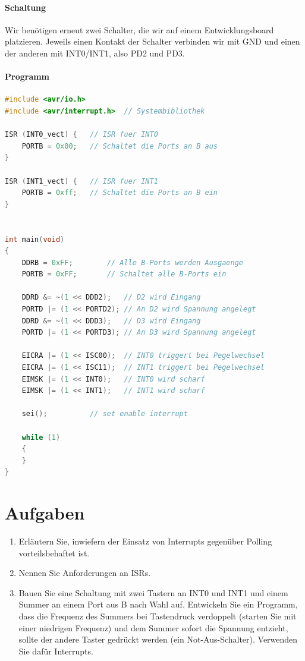 \documentclass[11pt,a4paper]{scrartcl}
\begin{document}
\paragraph{Schaltung}
Wir benötigen erneut zwei Schalter, die wir auf einem Entwicklungsboard platzieren. Jeweils einen Kontakt der Schalter verbinden wir mit GND und einen der anderen mit INT0/INT1, also PD2 und PD3.
\paragraph{Programm}\quad
\begin{lstlisting}[language=C]
#include <avr/io.h>
#include <avr/interrupt.h>	// Systembibliothek

ISR (INT0_vect) {	// ISR fuer INT0
	PORTB = 0x00;	// Schaltet die Ports an B aus
}			

ISR (INT1_vect) {	// ISR fuer INT1
	PORTB = 0xff;	// Schaltet die Ports an B ein
}


int main(void)
{
	DDRB = 0xFF;		// Alle B-Ports werden Ausgaenge
	PORTB = 0xFF;		// Schaltet alle B-Ports ein 
	
	DDRD &= ~(1 << DDD2); 	// D2 wird Eingang
	PORTD |= (1 << PORTD2);	// An D2 wird Spannung angelegt
	DDRD &= ~(1 << DDD3);	// D3 wird Eingang
	PORTD |= (1 << PORTD3);	// An D3 wird Spannung angelegt
	
	EICRA |= (1 << ISC00);	// INT0 triggert bei Pegelwechsel
	EICRA |= (1 << ISC11);	// INT1 triggert bei Pegelwechsel
	EIMSK |= (1 << INT0);	// INT0 wird scharf
	EIMSK |= (1 << INT1);	// INT1 wird scharf
	
	sei();			// set enable interrupt
	
    while (1) 
    {
    }
}
\end{lstlisting}
\section*{Aufgaben}
\begin{enumerate}
\item Erläutern Sie, inwiefern der Einsatz von Interrupts gegenüber Polling vorteilsbehaftet ist.
\item Nennen Sie Anforderungen an ISRs.
\item Bauen Sie eine Schaltung mit zwei Tastern an INT0 und INT1 und einem Summer an einem Port aus B nach Wahl auf. Entwickeln Sie ein Programm, dass die Frequenz des Summers bei Tastendruck verdoppelt (starten Sie mit einer niedrigen Frequenz) und dem Summer sofort die Spannung entzieht, sollte der andere Taster gedrückt werden (ein Not-Aus-Schalter). Verwenden Sie dafür Interrupts.
\end{enumerate}
\pagebreak
\end{document}
